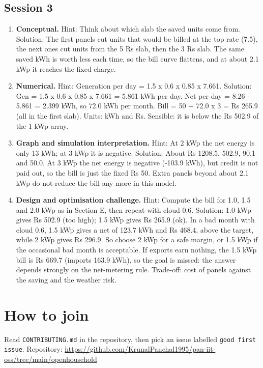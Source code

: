 \documentclass[11pt,a4paper]{article}
\begin{document}
\subsection*{Session 3}
\begin{enumerate}[nosep]
\item \textbf{Conceptual.} Hint: Think about which slab the saved units come from. Solution: The first panels cut units that would be billed at the top rate (7.5), the next ones cut units from the 5 Rs slab, then the 3 Rs slab. The same saved kWh is worth less each time, so the bill curve flattens, and at about 2.1 kWp it reaches the fixed charge.
\item \textbf{Numerical.} Hint: Generation per day = 1.5 x 0.6 x 0.85 x 7.661. Solution: Gen = 1.5 x 0.6 x 0.85 x 7.661 = 5.861 kWh per day. Net per day = 8.26 - 5.861 = 2.399 kWh, so 72.0 kWh per month. Bill = 50 + 72.0 x 3 = Rs 265.9 (all in the first slab). Units: kWh and Rs. Sensible: it is below the Rs 502.9 of the 1 kWp array.
\item \textbf{Graph and simulation interpretation.} Hint: At 2 kWp the net energy is only 13 kWh; at 3 kWp it is negative. Solution: About Rs 1208.5, 502.9, 90.1 and 50.0. At 3 kWp the net energy is negative (-103.9 kWh), but credit is not paid out, so the bill is just the fixed Rs 50. Extra panels beyond about 2.1 kWp do not reduce the bill any more in this model.
\item \textbf{Design and optimisation challenge.} Hint: Compute the bill for 1.0, 1.5 and 2.0 kWp as in Section E, then repeat with cloud 0.6. Solution: 1.0 kWp gives Rs 502.9 (too high); 1.5 kWp gives Rs 265.9 (ok). In a bad month with cloud 0.6, 1.5 kWp gives a net of 123.7 kWh and Rs 468.4, above the target, while 2 kWp gives Rs 296.9. So choose 2 kWp for a safe margin, or 1.5 kWp if the occasional bad month is acceptable. If exports earn nothing, the 1.5 kWp bill is Rs 669.7 (imports 163.9 kWh), so the goal is missed: the answer depends strongly on the net-metering rule. Trade-off: cost of panels against the saving and the weather risk.
\end{enumerate}

\section{How to join}
Read \texttt{CONTRIBUTING.md} in the repository, then pick an issue labelled \texttt{good first issue}. Repository: \url{https://github.com/KrunalPanchal1995/pan-iit-oss/tree/main/openhousehold}
\end{document}
